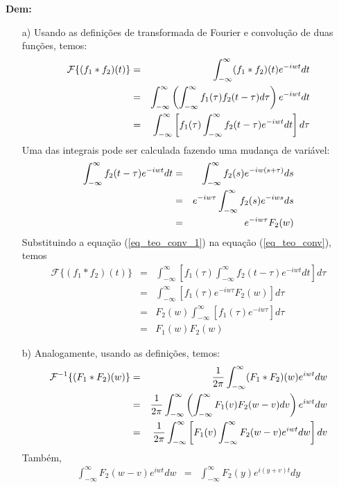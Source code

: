 \documentclass[a4paper,10pt]{book}
\begin{document}
{\bf Dem:}
 \begin{itemize}
 \item[a)] Usando as definições de transformada de Fourier e convolução de duas funções, temos:
 \begin{eqnarray}
 \nonumber \mathcal{F}\{(f_1*f_2)(t)\}&=&\int_{-\infty}^\infty (f_1*f_2)(t)e^{-iwt}dt\\
 \nonumber &=&\int_{-\infty}^\infty \left(\int_{-\infty}^\infty f_1(\tau)f_2(t-\tau)d\tau\right)e^{-iwt}dt\\
 &=&\int_{-\infty}^\infty \left[f_1(\tau) \int_{-\infty}^\infty f_2(t-\tau)e^{-iwt}dt\right]d\tau  {\label{eq_teo_conv}}
 \end{eqnarray}
 Uma das integrais pode ser calculada fazendo uma mudança de variável:
 \begin{eqnarray}
 \nonumber \int_{-\infty}^\infty f_2(t-\tau)e^{-iwt}dt&=&\int_{-\infty}^\infty f_2(s)e^{-iw(s+\tau)}ds \\
 \nonumber &=&e^{-iw\tau}\int_{-\infty}^\infty f_2(s)e^{-iws}ds \\
 &=&e^{-iw\tau}F_2(w) {\label{eq_teo_conv_1}}
 \end{eqnarray}
 Substituindo a equação (\ref{eq_teo_conv_1}) na equação (\ref{eq_teo_conv}), temos
 \begin{eqnarray*}
 \mathcal{F}\{(f_1*f_2)(t)\}&=&\int_{-\infty}^\infty \left[f_1(\tau) \int_{-\infty}^\infty f_2(t-\tau)e^{-iwt}dt\right]d\tau\\
 &=&\int_{-\infty}^\infty \left[f_1(\tau) e^{-iw\tau}F_2(w)\right]d\tau\\
 &=&F_2(w)\int_{-\infty}^\infty \left[f_1(\tau) e^{-iw\tau}\right]d\tau\\
 &=&F_1(w)F_2(w)
 \end{eqnarray*}
 \item[b)] Analogamente, usando as definições, temos:
 \begin{eqnarray}
 \nonumber\mathcal{F}^{-1}\{(F_1*F_2)(w)\}&=&\frac{1}{2\pi}\int_{-\infty}^\infty (F_1*F_2)(w)e^{iwt}dw\\
 \nonumber &=&\frac{1}{2\pi}\int_{-\infty}^\infty \left(\int_{-\infty}^\infty F_1(v)F_2(w-v)dv \right)e^{iwt}dw\\
 &=&\frac{1}{2\pi}\int_{-\infty}^\infty\left[ F_1(v) \int_{-\infty}^\infty F_2(w-v)e^{iwt}dw \right]dv {\label{eq_teo_conv_2}}
 \end{eqnarray}
 Também,
 \begin{eqnarray}
 \nonumber \int_{-\infty}^\infty F_2(w-v)e^{iwt}dw&=&\int_{-\infty}^\infty F_2(y)e^{i(y+v)t}dy \\

\end{eqnarray}
\end{itemize}
\end{document}
